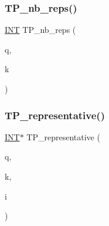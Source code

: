 \mbox{\label{data_8_c_a0d21ccdea3c7999c1a86c4a56bda754a}} 
\subsubsection{\texorpdfstring{T\+P\+\_\+nb\+\_\+reps()}{TP\_nb\_reps()}}
{\footnotesize\ttfamily \mbox{\hyperlink{galois_8h_a09fddde158a3a20bd2dcadb609de11dc}{I\+NT}} T\+P\+\_\+nb\+\_\+reps (\begin{DoxyParamCaption}\item[{\mbox{\hyperlink{galois_8h_a09fddde158a3a20bd2dcadb609de11dc}{I\+NT}}}]{q,  }\item[{\mbox{\hyperlink{galois_8h_a09fddde158a3a20bd2dcadb609de11dc}{I\+NT}}}]{k }\end{DoxyParamCaption})}

\mbox{\label{data_8_c_ac2c188533ce60013f49bbb56084448cd}} 
\subsubsection{\texorpdfstring{T\+P\+\_\+representative()}{TP\_representative()}}
{\footnotesize\ttfamily \mbox{\hyperlink{galois_8h_a09fddde158a3a20bd2dcadb609de11dc}{I\+NT}}$\ast$ T\+P\+\_\+representative (\begin{DoxyParamCaption}\item[{\mbox{\hyperlink{galois_8h_a09fddde158a3a20bd2dcadb609de11dc}{I\+NT}}}]{q,  }\item[{\mbox{\hyperlink{galois_8h_a09fddde158a3a20bd2dcadb609de11dc}{I\+NT}}}]{k,  }\item[{\mbox{\hyperlink{galois_8h_a09fddde158a3a20bd2dcadb609de11dc}{I\+NT}}}]{i }\end{DoxyParamCaption})}

\mbox{\label{data_8_c_a90e876c188820cc19270147c8a3fe8de}} 
